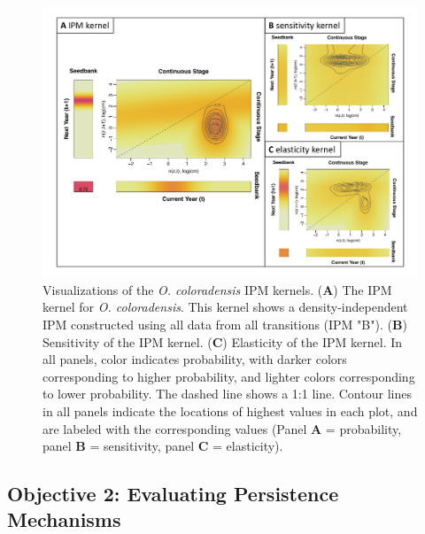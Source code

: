 \documentclass[12pt, letterpaper]{article}
\begin{document}
\begin{figure}[h!]
  \centering
  \includegraphics[width=\textwidth]{figures/KernelMultipanelFigure.pdf}
  \caption{\internallinenumbers Visualizations of the \textit{O. coloradensis} IPM kernels. (\textbf{A}) The IPM kernel for \textit{O. coloradensis}. This kernel shows a density-independent IPM constructed using all data from all transitions (IPM "B"). (\textbf{B}) Sensitivity of the IPM kernel. (\textbf{C}) Elasticity of the IPM kernel. In all panels, color indicates probability, with darker colors corresponding to higher probability, and lighter colors corresponding to lower probability. The dashed line shows a 1:1 line. Contour lines in all panels indicate the locations of highest values in each plot, and are labeled with the corresponding values (Panel \textbf{A} = probability, panel \textbf{B} = sensitivity, panel \textbf{C} = elasticity).}
  \label{fig:IPMKernel}
\end{figure} 
\subsection{Objective 2: Evaluating Persistence Mechanisms}
\end{document}
